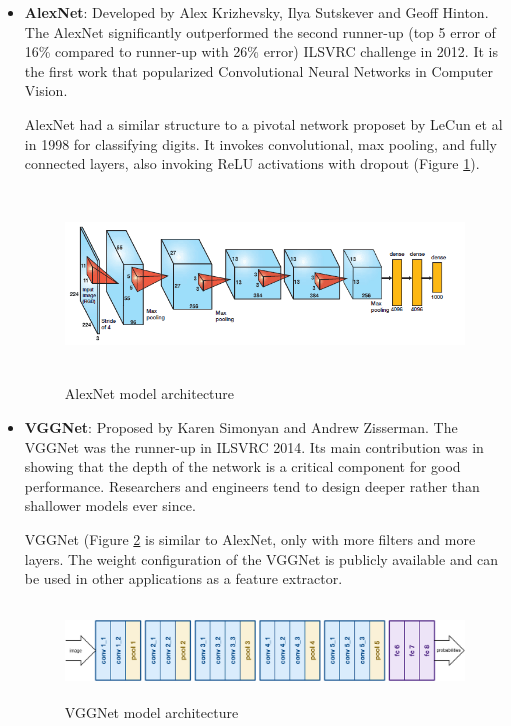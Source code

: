 \documentclass[twoside]{article}
\begin{document}
\begin{itemize}
\item \textbf{AlexNet}\cite{alexnet}: Developed by Alex Krizhevsky, Ilya Sutskever and Geoff Hinton. The AlexNet significantly outperformed the second runner-up (top 5 error of 16\% compared to runner-up with 26\% error) ILSVRC challenge in 2012. It is the first work that popularized Convolutional Neural Networks in Computer Vision.

AlexNet had a similar structure to a pivotal network proposet by LeCun et al in 1998 for classifying digits\cite{lecun1998gradient}. It invokes convolutional, max pooling, and fully connected layers, also invoking ReLU activations with dropout (Figure \ref{fig:alexnet}).

\begin{figure}[!htb]
\centering
\includegraphics[height = 2in]{pics/alexnet.png}
\caption{AlexNet model architecture}
\label{fig:alexnet}
\end{figure}

\item \textbf{VGGNet}\cite{vggnet}: Proposed by Karen Simonyan and Andrew Zisserman. The VGGNet was the runner-up in ILSVRC 2014. Its main contribution was in showing that the depth of the network is a critical component for good performance. Researchers and engineers tend to design deeper rather than shallower models ever since.

VGGNet (Figure \ref{fig:vgg} is similar to AlexNet, only with more filters and more layers. The weight configuration of the VGGNet is publicly available and can be used in other applications as a feature extractor.
\begin{figure}[!htb]
\centering
\includegraphics[height = 1in]{pics/vggnet.png}
\caption{VGGNet model architecture}
\label{fig:vgg}
\end{figure}


\end{itemize}
\end{document}

